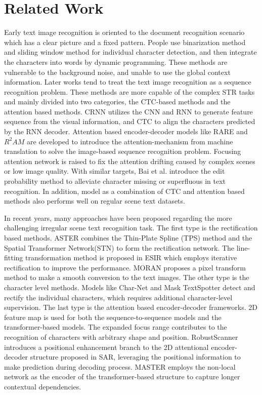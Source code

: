 \documentclass[runningheads]{llncs}
\begin{document}
\section{Related Work}
Early text image recognition is oriented to the document recognition scenario which has a clear picture and a fixed pattern. People use binarization method\cite{casey1996survey} and sliding window method\cite{wang2011end} for individual character detection, and then integrate the characters into words by dynamic programming. These methods are vulnerable to the background noise, and unable to use the global context information. Later works tend to treat the text image recognition as a sequence recognition problem. These methods are more capable of the complex STR tasks and mainly divided into two categories, the CTC-based methods and the attention based methods. CRNN\cite{shi2016end} utilizes the CNN and RNN to generate feature sequence from the visual information, and CTC to align the characters predicted by the RNN decoder. Attention based encoder-decoder models like RARE\cite{shi2016robust} and $R^2AM$\cite{lee2016recursive} are developed to introduce the attention-mechanism from machine translation\cite{bahdanau2014neural} to solve the image-based sequence recognition problem. Focusing attention network\cite{cheng2017focusing} is raised to fix the attention drifting caused by complex scenes or low image quality. With similar targets, Bai et al. introduce the edit probability\cite{bai2018edit} method to alleviate character missing or superfluous in text recognition. In addition, model as a combination of CTC and attention based methods\cite{zuo2019natural} also performs well on regular scene text datasets.

In recent years, many approaches have been proposed regarding the more challenging irregular scene text recognition task. The first type is the rectification based methods. ASTER\cite{shi2018aster} combines the Thin-Plate Spline (TPS) method\cite{bookstein1993thin} and the Spatial Transformer Network(STN)\cite{jaderberg2015spatial} to form the rectification network. The line-fitting transformation method is proposed in ESIR\cite{zhan2019esir} which employs iterative rectification to improve the performance. MORAN\cite{luo2019moran} proposes a pixel transform method to make a smooth conversion to the text images. The other type is the character level methods. Models like Char-Net\cite{liu2018char} and Mask TextSpotter\cite{liao2019mask} detect and rectify the individual characters, which requires additional character-level supervision. The last type is the attention based encoder-decoder frameworks. 2D feature map is used for both the sequence-to-sequence models\cite{li2019show,yue2020robustscanner} and the transformer-based models\cite{yang2020holistic,lu2019master}. The expanded focus range contributes to the recognition of characters with arbitrary shape and position. RobustScanner\cite{yue2020robustscanner} introduces a positional enhancement branch to the 2D attentional encoder-decoder structure proposed in SAR\cite{li2019show}, leveraging the positional information to make prediction during decoding process. MASTER\cite{lu2019master} employs the non-local network as the encoder of the transformer-based structure to capture longer contextual dependencies.
\end{document}
